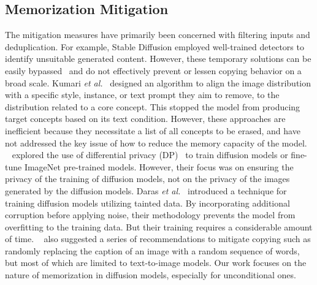 \subsection{Memorization Mitigation} 
The mitigation measures have primarily been concerned with filtering inputs and deduplication. 
For example, Stable Diffusion employed well-trained detectors to identify unsuitable generated content. 
However, these temporary solutions can be easily bypassed~\cite{wen2024hard,rando2022red} and do not effectively prevent or lessen copying behavior on a broad scale. 
Kumari \MakeLowercase{\textit{et al.}}~\cite{kumari2023ablating} designed an algorithm to align the image distribution with a specific style, instance, or text prompt they aim to remove, to the distribution related to a core concept. 
This stopped the model from producing target concepts based on its text condition.
However, these approaches are inefficient because they necessitate a list of all concepts to be erased, and have not addressed the key issue of how to reduce the memory capacity of the model.
~\cite{dockhorn2022differentially,ghalebikesabi2023differentially} explored the use of differential privacy (DP)~\cite{dwork2006differential} to train diffusion models or fine-tune ImageNet pre-trained models. However, their focus was on ensuring the privacy of the training of diffusion models, not on the privacy of the images generated by the diffusion models. 
Daras \MakeLowercase{\textit{et al.}}~\cite{daras2024ambient} introduced a technique for training diffusion models utilizing tainted data. By incorporating additional corruption before applying noise, their methodology prevents the model from overfitting to the training data. But their training requires a considerable amount of time. 
~\cite{somepalli2024understanding,wen2023detecting, ren2024unveiling} also suggested a series of recommendations to mitigate copying such as randomly replacing the caption of an image with a random sequence of words, but most of which are limited to text-to-image models. Our work focuses on the nature of memorization in diffusion models, especially for unconditional ones. 

